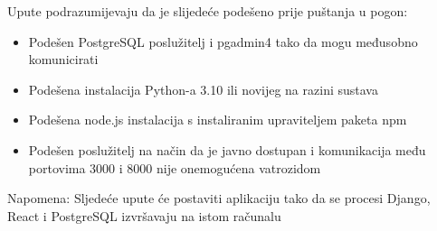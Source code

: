 			
			
			Upute podrazumijevaju da je slijedeće podešeno prije puštanja u pogon:
			\begin{itemize}
				\item Podešen PostgreSQL poslužitelj i pgadmin4 tako da mogu međusobno komunicirati
				\item Podešena instalacija Python-a 3.10 ili novijeg na razini sustava
				\item Podešena node.js instalacija s instaliranim upraviteljem paketa npm
				\item Podešen poslužitelj na način da je javno dostupan i komunikacija među portovima 3000 i 8000 nije onemogućena vatrozidom
			\end{itemize}	
			Napomena: Sljedeće upute će postaviti aplikaciju tako da se procesi Django, React i PostgreSQL izvršavaju na istom računalu
			
